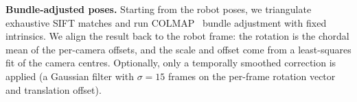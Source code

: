 \documentclass[conference]{IEEEtran}
\begin{document}
\textbf{Bundle-adjusted poses.} Starting from the robot poses, we triangulate exhaustive SIFT matches and run COLMAP~\cite{schonberger2016sfm} bundle adjustment with fixed intrinsics. We align the result back to the robot frame: the rotation is the chordal mean of the per-camera offsets, and the scale and offset come from a least-squares fit of the camera centres. Optionally, only a temporally smoothed correction is applied (a Gaussian filter with $\sigma{=}15$ frames on the per-frame rotation vector and translation offset).



\end{document}

